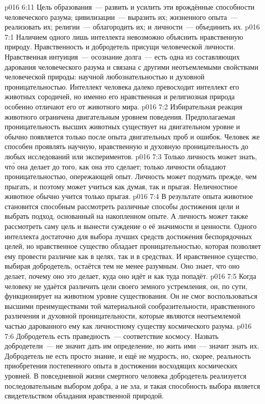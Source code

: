 \vs p016 6:11 Цель образования~--- развить и усилить эти врождённые способности человеческого разума; цивилизации~--- выразить их; жизненного опыта~--- реализовать их; религии~--- облагородить их; и личности~--- объединить их.
\vs p016 7:1 Наличием одного лишь интеллекта невозможно объяснить нравственную природу. Нравственность и добродетель присущи человеческой личности. Нравственная интуиция~--- осознание долга~--- есть одна из составляющих дарования человеческого разума и связана с другими неотъемлемыми свойствами человеческой природы: научной любознательностью и духовной проницательностью. Интеллект человека далеко превосходит интеллект его животных сородичей, но именно его нравственная и религиозная природа особенно отличают его от животного мира.
\vs p016 7:2 Избирательная реакция животного ограничена двигательным уровнем поведения. Предполагаемая проницательность высших животных существует на двигательном уровне и обычно появляется только после опыта двигательных проб и ошибок. Человек же способен проявлять научную, нравственную и духовную проницательность до любых исследований или экспериментов.
\vs p016 7:3 Только личность может знать, чт\'о она делает до того, как она это сделает; только личности обладают проницательностью, опережающей опыт. Личность может подумать прежде, чем прыгать, и поэтому может учиться как думая, так и прыгая. Неличностное животное обычно учится только прыгая.
\vs p016 7:4 В результате опыта животное становится способным рассмотреть различные способы достижения цели и выбрать подход, основанный на накопленном опыте. А личность может также рассмотреть саму цель и вынести суждение о её значимости и ценности. Одного интеллекта достаточно для выбора лучших средств достижения беспорядочных целей, но нравственное существо обладает проницательностью, которая позволяет ему провести различие как в целях, так и в средствах. И нравственное существо, выбирая добродетель, остаётся тем не менее разумным. Оно знает, что оно делает, почему оно это делает, куда оно идёт и как туда попадёт.
\vs p016 7:5 Когда человеку не удаётся различить цели своего земного устремления, он, по сути, функционирует на животном уровне существования. Он не смог воспользоваться высшими преимуществами той материальной сообразительности, нравственного различения и духовной проницательности, которые являются неотъемлемой частью дарованного ему как личностному существу космического разума.
\vs p016 7:6 \pc Добродетель есть праведность~--- соответствие космосу. Назвать добродетели~--- не значит дать им определение, но жить ими~--- значит знать их. Добродетель не есть просто знание, и ещё не мудрость, но, скорее, реальность приобретения постепенного опыта в достижении восходящих космических уровней. В повседневной жизни смертного человека добродетель реализуется последовательным выбором добра, а не зла, и такая способность выбора является свидетельством обладания нравственной природой.
